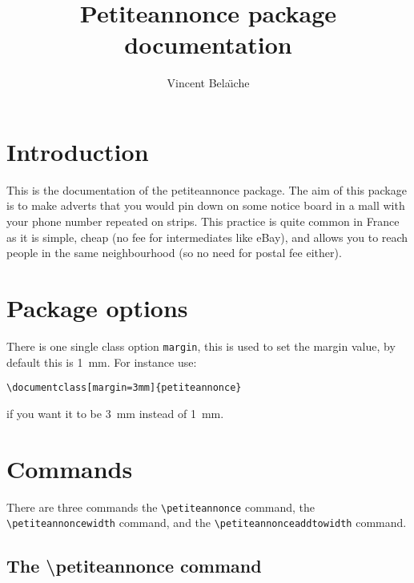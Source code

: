 \documentclass{article}
\title{Petiteannonce package documentation}
\author{Vincent Bela\"\i che}
\begin{document}
\maketitle
\section{Introduction}
This is the documentation of the petiteannonce package. The aim of this package is to
make adverts that you would pin down on some notice board in a mall with your
phone number repeated on strips. This practice is quite common in France as it
is simple, cheap (no fee for intermediates like eBay\texttrademark),
and allows you to reach people in the same neighbourhood (so no need for
postal fee either).

\section{Package options}

There is one single class option \verb!margin!, this is used to set the margin value, by default this is
\SI{1}{\milli\metre}. For instance use:

\verb!\documentclass[margin=3mm]{petiteannonce}!

\noindent if you want it to be \SI{3}{\milli\metre} instead of \SI{1}{\milli\metre}.

\section{Commands}

There are three commands the \verb!\petiteannonce! command, the \verb!\petiteannoncewidth!
command, and the \verb!\petiteannonceaddtowidth! command.

\subsection{The \textbackslash petiteannonce command}
\end{document}
